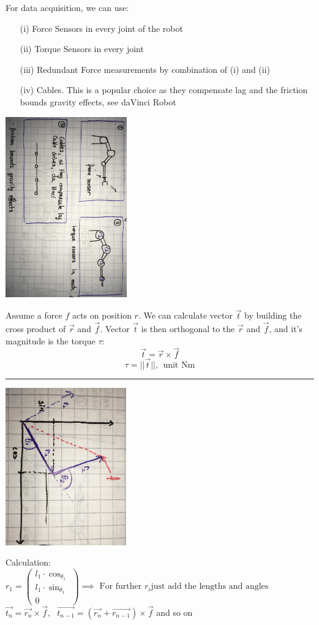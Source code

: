 \documentclass{exerciseBlue}
\begin{document}
\newpage
For data acquisition, we can use:
\begin{itemize}
	\item[(i)] Force Sensors in every joint of the robot
	\item[(ii)] Torque Sensors in every joint
	\item[(iii)] Redundant Force measurements by combination of (i) and (ii)
	\item[(iv)] Cables. This is a popular choice as they compensate lag and the friction bounds gravity effects, see daVinci Robot
\end{itemize}
\begin{center}
	\includegraphics[height = 7.8cm]{Images/robots}
\end{center}
Assume a force $f$ acts on position $r$. We can calculate vector $\vec{t}$ by building the cross product of $\vec{r}$ and $\vec{f}$. Vector $\vec{t}$ is then orthogonal to the $\vec{r}$ and $\vec{f}$, and it's magnitude is the torque $\tau$: 
$$\vec{t} = \vec{r} \times \vec{f}$$
$$\tau = ||\vec{t}||, \ \ \text{unit Nm}$$
\noindent\rule{\textwidth}{0.3pt}
\newpage
\begin{center}
	\includegraphics[height = 6.8cm]{Images/TorqueCalc}
\end{center}
Calculation:
$r_1 = \begin{pmatrix}
l_1\cdot \cos_{\theta_1}\\l_1\cdot\sin_{\theta_1}\\0
\end{pmatrix} \implies \text{ For further } r_i \text{just add the lengths and angles}$
$\vec{t_n} = \vec{r_n} \times \vec{f}, \ \ \ \vec{t_{n-1}} = (\vec{r_n} + \vec{r_{n-1}}) \times \vec{f}$ and so on
\end{document}
